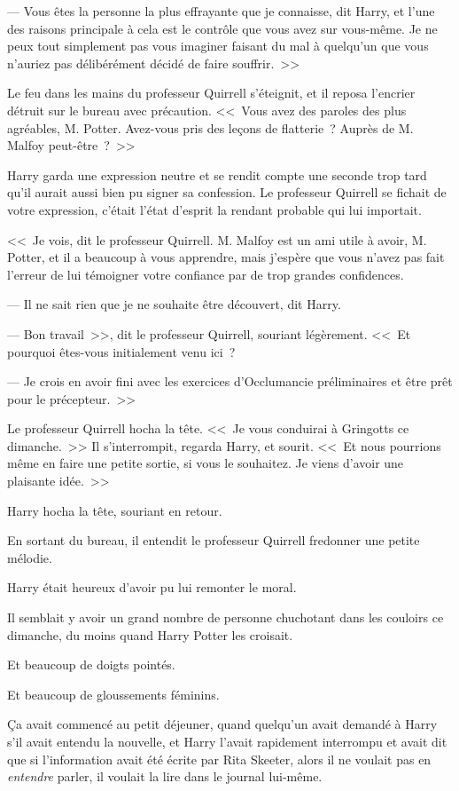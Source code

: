 --- Vous êtes la personne la plus effrayante que je connaisse, dit Harry, et l'une des raisons principale à cela est le contrôle que vous avez sur vous-même. Je ne peux tout simplement pas vous imaginer faisant du mal à quelqu'un que vous n'auriez pas délibérément décidé de faire souffrir.~>>

Le feu dans les mains du professeur Quirrell s'éteignit, et il reposa l'encrier détruit sur le bureau avec précaution. <<~Vous avez des paroles des plus agréables, M. Potter. Avez-vous pris des leçons de flatterie~? Auprès de M. Malfoy peut-être~?~>>

Harry garda une expression neutre et se rendit compte une seconde trop tard qu'il aurait aussi bien pu signer sa confession. Le professeur Quirrell se fichait de votre expression, c'était l'état d'esprit la rendant probable qui lui importait.

<<~Je vois, dit le professeur Quirrell. M. Malfoy est un ami utile à avoir, M. Potter, et il a beaucoup à vous apprendre, mais j'espère que vous n'avez pas fait l'erreur de lui témoigner votre confiance par de trop grandes confidences.

--- Il ne sait rien que je ne souhaite être découvert, dit Harry.

--- Bon travail~>>, dit le professeur Quirrell, souriant légèrement. <<~Et pourquoi êtes-vous initialement venu ici~?

--- Je crois en avoir fini avec les exercices d'Occlumancie préliminaires et être prêt pour le précepteur.~>>

Le professeur Quirrell hocha la tête. <<~Je vous conduirai à Gringotts ce dimanche.~>> Il s'interrompit, regarda Harry, et sourit. <<~Et nous pourrions même en faire une petite sortie, si vous le souhaitez. Je viens d'avoir une plaisante idée.~>>

Harry hocha la tête, souriant en retour.

En sortant du bureau, il entendit le professeur Quirrell fredonner une petite mélodie.

Harry était heureux d'avoir pu lui remonter le moral.

\later

Il semblait y avoir un grand nombre de personne chuchotant dans les couloirs ce dimanche, du moins quand Harry Potter les croisait.

Et beaucoup de doigts pointés.

Et beaucoup de gloussements féminins.

Ça avait commencé au petit déjeuner, quand quelqu'un avait demandé à Harry s'il avait entendu la nouvelle, et Harry l'avait rapidement interrompu et avait dit que si l'information avait été écrite par Rita Skeeter, alors il ne voulait pas en \emph{entendre} parler, il voulait la lire dans le journal lui-même.

